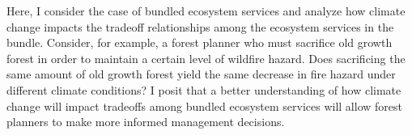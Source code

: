 Here, I consider the case of bundled ecosystem services and analyze how climate change impacts the tradeoff relationships among the ecosystem services in the bundle. Consider, for example, a forest planner who must sacrifice old growth forest in order to maintain a certain level of wildfire hazard. Does sacrificing the same amount of old growth forest yield the same decrease in fire hazard under different climate conditions? I posit that a better understanding of how climate change will impact tradeoffs among bundled ecosystem services will allow forest planners to make more informed management decisions.

%
%
%
